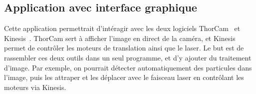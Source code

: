 \subsection{Application avec interface graphique}

Cette application permettrait d'intéragir avec les deux logiciels ThorCam~\cite{thorcamSoftware} et Kinesis~\cite{kinesisSoftware}. ThorCam sert à afficher l'image en direct de la caméra, et Kinesis permet de contrôler les moteurs de translation ainsi que le laser. Le but est de rassembler ces deux outils dans un seul programme, et d'y ajouter du traitement d'image. Par exemple, on pourrait détecter automatiquement des particules dans l'image, puis les attraper et les déplacer avec le faisceau laser en contrôlant les moteurs via Kinesis.




